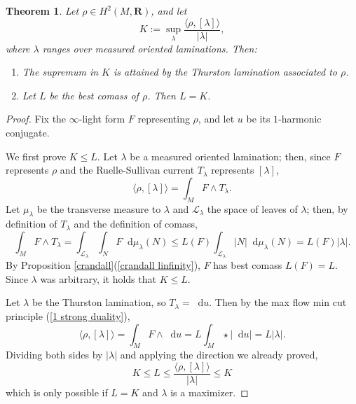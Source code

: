 \documentclass[reqno,11pt]{amsart}
\newcommand{\RR}{\mathbf{R}}
\newcommand*\dif{\mathop{}\!\mathrm{d}}
\newtheorem{theorem}{Theorem}[section]
\theoremstyle{definition}
\numberwithin{equation}{section}
\begin{document}
\begin{theorem}\label{L equals K}
	Let $\rho \in H^2(M, \RR)$, and let 
	$$K := \sup_\lambda \frac{\langle \rho, [\lambda]\rangle}{|\lambda|},$$
	where $\lambda$ ranges over measured oriented laminations. Then:
\begin{enumerate}
	\item The supremum in $K$ is attained by the Thurston lamination associated to $\rho$.
	\item Let $L$ be the best comass of $\rho$. Then $L = K$.
\end{enumerate}
\end{theorem}
\begin{proof}
Fix the $\infty$-light form $F$ representing $\rho$, and let $u$ be its $1$-harmonic conjugate.

We first prove $K \leq L$.
Let $\lambda$ be a measured oriented lamination; then, since $F$ represents $\rho$ and the Ruelle-Sullivan current $T_\lambda$ represents $[\lambda]$,
$$\langle \rho, [\lambda]\rangle = \int_M F \wedge T_\lambda.$$
Let $\mu_\lambda$ be the transverse measure to $\lambda$ and $\mathscr L_\lambda$ the space of leaves of $\lambda$; then, by definition of $T_\lambda$ and the definition of comass,
$$\int_M F \wedge T_\lambda = \int_{\mathscr L_\lambda} \int_N F \dif \mu_\lambda(N) \leq L(F) \int_{\mathscr L_\lambda} |N| \dif \mu_\lambda(N) = L(F) |\lambda|.$$
By Proposition \ref{crandall}(\ref{crandall linfinity}), $F$ has best comass $L(F) = L$.
Since $\lambda$ was arbitrary, it holds that $K \leq L$.

Let $\lambda$ be the Thurston lamination, so $T_\lambda = \dif u$.
Then by the max flow min cut principle (\ref{1 strong duality}),
$$\langle \rho, [\lambda]\rangle = \int_M F \wedge \dif u = L \int_M \star |\dif u| = L|\lambda|.$$
Dividing both sides by $|\lambda|$ and applying the direction we already proved,
$$K \leq L \leq \frac{\langle \rho, [\lambda]\rangle}{|\lambda|} \leq K$$
which is only possible if $L = K$ and $\lambda$ is a maximizer.
\end{proof}

\printbibliography
\end{document}
